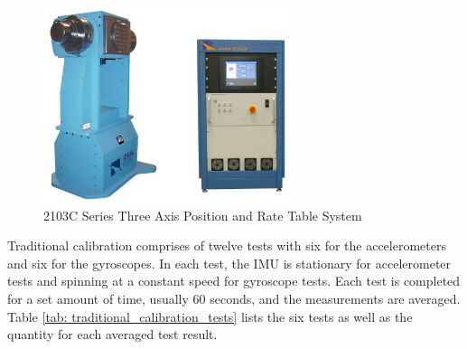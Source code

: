 \begin{figure}[h] 
	\centering
	\includegraphics[width=0.65\textwidth]{./images/three_axis_rate_table_example.png}
	\caption{2103C Series Three Axis Position and Rate Table System}
	\label{fig: three axis rate table example}
\end{figure}
\FloatBarrier

Traditional calibration comprises of twelve tests with six for the accelerometers and six for the gyroscopes. In each test, the IMU is stationary for accelerometer tests and spinning at a constant speed for gyroscope tests. Each test is completed for a set amount of time, usually 60 seconds, and the measurements are averaged. Table \ref{tab: traditional_calibration_tests} lists the six tests as well as the quantity for each averaged test result.

